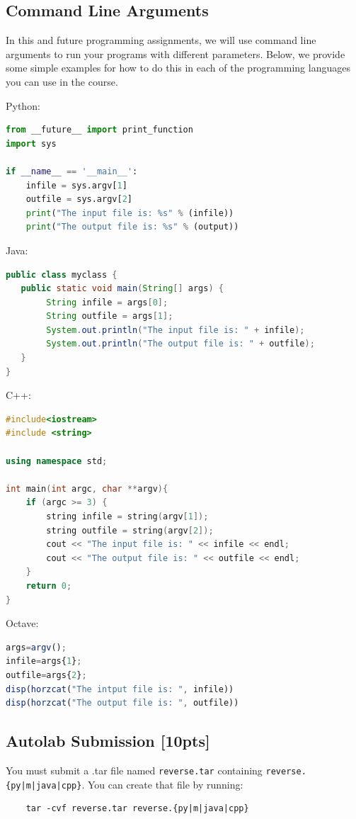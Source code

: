 \documentclass[12pt]{article}
\begin{document}
\subsection{Command Line Arguments}

In this and future programming assignments, we will use command line arguments to run your programs with different parameters. Below, we provide some simple examples for how to do this in each of the programming languages you can use in the course.

Python:
\begin{lstlisting}[language=Python]
from __future__ import print_function
import sys

if __name__ == '__main__':
    infile = sys.argv[1]
    outfile = sys.argv[2]
    print("The input file is: %s" % (infile))
    print("The output file is: %s" % (output))
\end{lstlisting}
 
Java:
\begin{lstlisting}[language=Java]
public class myclass {
   public static void main(String[] args) {
        String infile = args[0];
        String outfile = args[1];
        System.out.println("The input file is: " + infile);
        System.out.println("The output file is: " + outfile);
   }
}
\end{lstlisting}

C++:
\begin{lstlisting}[language=C++]
#include<iostream>
#include <string>

using namespace std;

int main(int argc, char **argv){
    if (argc >= 3) {
        string infile = string(argv[1]);
        string outfile = string(argv[2]);
        cout << "The input file is: " << infile << endl;
        cout << "The output file is: " << outfile << endl;
    }
    return 0;
}
\end{lstlisting}

Octave:
\begin{lstlisting}[language=Octave]
args=argv();
infile=args{1};
outfile=args{2};
disp(horzcat("The intput file is: ", infile))
disp(horzcat("The output file is: ", outfile))
\end{lstlisting}

\subsection{Autolab Submission [10pts]}

You must submit a .tar file named \texttt{reverse.tar} containing \texttt{reverse.\{py|m|java|cpp\}}. You can create that file by running:
\begin{verbatim}    tar -cvf reverse.tar reverse.{py|m|java|cpp}\end{verbatim}
\end{document}
